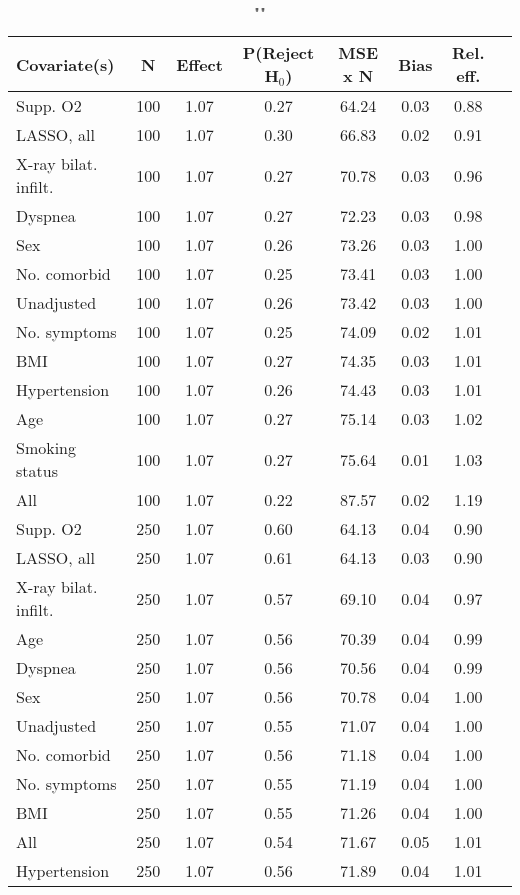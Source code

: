 \documentclass{article}
\begin{document}
{\tabcolsep=6pt  %
\begin{longtable}{lccccccc}
\caption{""} \\
Covariate(s) & N & Effect & P(Reject H$_0$) & MSE x N & Bias & Rel. eff.\\ \midrule
Supp. O2 & 100 & 1.07 & 0.27 & 64.24 & 0.03 & 0.88 \\ 
LASSO, all & 100 & 1.07 & 0.30 & 66.83 & 0.02 & 0.91 \\ 
X-ray bilat. infilt. & 100 & 1.07 & 0.27 & 70.78 & 0.03 & 0.96 \\ 
Dyspnea & 100 & 1.07 & 0.27 & 72.23 & 0.03 & 0.98 \\ 
Sex & 100 & 1.07 & 0.26 & 73.26 & 0.03 & 1.00 \\ 
No. comorbid & 100 & 1.07 & 0.25 & 73.41 & 0.03 & 1.00 \\ 
Unadjusted & 100 & 1.07 & 0.26 & 73.42 & 0.03 & 1.00 \\ 
No. symptoms & 100 & 1.07 & 0.25 & 74.09 & 0.02 & 1.01 \\ 
BMI & 100 & 1.07 & 0.27 & 74.35 & 0.03 & 1.01 \\ 
Hypertension & 100 & 1.07 & 0.26 & 74.43 & 0.03 & 1.01 \\ 
Age & 100 & 1.07 & 0.27 & 75.14 & 0.03 & 1.02 \\ 
Smoking status & 100 & 1.07 & 0.27 & 75.64 & 0.01 & 1.03 \\ 
All & 100 & 1.07 & 0.22 & 87.57 & 0.02 & 1.19 \\ \midrule 
Supp. O2 & 250 & 1.07 & 0.60 & 64.13 & 0.04 & 0.90 \\ 
LASSO, all & 250 & 1.07 & 0.61 & 64.13 & 0.03 & 0.90 \\ 
X-ray bilat. infilt. & 250 & 1.07 & 0.57 & 69.10 & 0.04 & 0.97 \\ 
Age & 250 & 1.07 & 0.56 & 70.39 & 0.04 & 0.99 \\ 
Dyspnea & 250 & 1.07 & 0.56 & 70.56 & 0.04 & 0.99 \\ 
Sex & 250 & 1.07 & 0.56 & 70.78 & 0.04 & 1.00 \\ 
Unadjusted & 250 & 1.07 & 0.55 & 71.07 & 0.04 & 1.00 \\ 
No. comorbid & 250 & 1.07 & 0.56 & 71.18 & 0.04 & 1.00 \\ 
No. symptoms & 250 & 1.07 & 0.55 & 71.19 & 0.04 & 1.00 \\ 
BMI & 250 & 1.07 & 0.55 & 71.26 & 0.04 & 1.00 \\ 
All & 250 & 1.07 & 0.54 & 71.67 & 0.05 & 1.01 \\ 
Hypertension & 250 & 1.07 & 0.56 & 71.89 & 0.04 & 1.01 \\ 

\end{longtable}}
\end{document}
